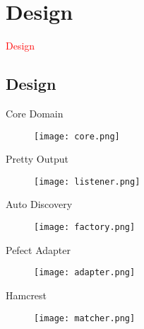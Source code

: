 \section{Design}
\label{sec:design}

\begin{frame}
  \begin{center}
    \Huge{\textcolor{red}{Design}}
  \end{center}
\end{frame}

\subsection{Design}

\begin{frame}{Core Domain}
    \centering
    \begin{figure}
      \centering
      \texttt{[image: core.png]}
    \end{figure}
\end{frame}

\begin{frame}{Pretty Output}
    \centering
    \begin{figure}
      \centering
      \texttt{[image: listener.png]}
    \end{figure}
\end{frame}

\begin{frame}{Auto Discovery}
    \centering
    \begin{figure}
      \centering
      \texttt{[image: factory.png]}
    \end{figure}
\end{frame}

\begin{frame}{Pefect Adapter}
    \centering
    \begin{figure}
      \centering
      \texttt{[image: adapter.png]}
    \end{figure}
\end{frame}

\begin{frame}{Hamcrest}
    \centering
    \begin{figure}
      \centering
      \texttt{[image: matcher.png]}
    \end{figure}
\end{frame}
